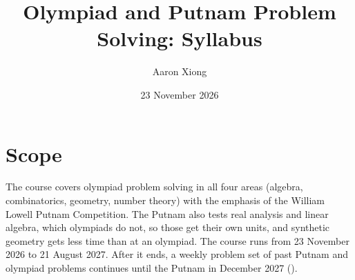 \documentclass[11pt]{scrartcl}
\title{Olympiad and Putnam Problem Solving: Syllabus}
\author{Aaron Xiong}
\date{23 November 2026}
\begin{document}
\maketitle

\section{Scope}
The course covers olympiad problem solving in all four areas (algebra, combinatorics, geometry,
number theory) with the emphasis of the William Lowell Putnam Competition. The Putnam also tests
real analysis and linear algebra, which olympiads do not, so those get their own units,
and synthetic geometry gets less time than at an olympiad.
The course runs from 23 November 2026 to 21 August 2027. After it ends, a weekly problem set of
past Putnam and olympiad problems continues until the Putnam in December 2027 ().
\end{document}
